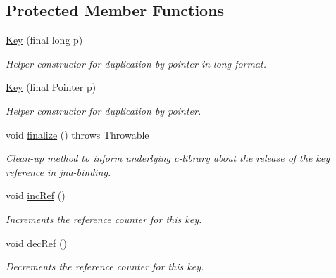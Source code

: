 \subsection*{Protected Member Functions}
\begin{DoxyCompactItemize}
\item 
\hyperlink{classorg_1_1libelektra_1_1Key_aeae5ed8b5eb0e9e4b7fce9ef9817fdfa}{Key} (final long p)
\begin{DoxyCompactList}\small\item\em Helper constructor for duplication by pointer in long format. \end{DoxyCompactList}\item 
\hyperlink{classorg_1_1libelektra_1_1Key_af40497ff85d172136ed1f274a50d37e7}{Key} (final Pointer p)
\begin{DoxyCompactList}\small\item\em Helper constructor for duplication by pointer. \end{DoxyCompactList}\item 
\mbox{\label{classorg_1_1libelektra_1_1Key_a1ae26aab95214a90a90bbcdeae828f7f}} 
void \hyperlink{classorg_1_1libelektra_1_1Key_a1ae26aab95214a90a90bbcdeae828f7f}{finalize} ()  throws Throwable 	
\begin{DoxyCompactList}\small\item\em Clean-\/up method to inform underlying c-\/library about the release of the key reference in jna-\/binding. \end{DoxyCompactList}\item 
\mbox{\label{classorg_1_1libelektra_1_1Key_a83a2c9059ea97153731bcce1a68fc3b4}} 
void \hyperlink{classorg_1_1libelektra_1_1Key_a83a2c9059ea97153731bcce1a68fc3b4}{inc\+Ref} ()
\begin{DoxyCompactList}\small\item\em Increments the reference counter for this key. \end{DoxyCompactList}\item 
\mbox{\label{classorg_1_1libelektra_1_1Key_a62e237b332ecaa64790f9487edff0bdb}} 
void \hyperlink{classorg_1_1libelektra_1_1Key_a62e237b332ecaa64790f9487edff0bdb}{dec\+Ref} ()
\begin{DoxyCompactList}\small\item\em Decrements the reference counter for this key. \end{DoxyCompactList}\end{DoxyCompactItemize}
